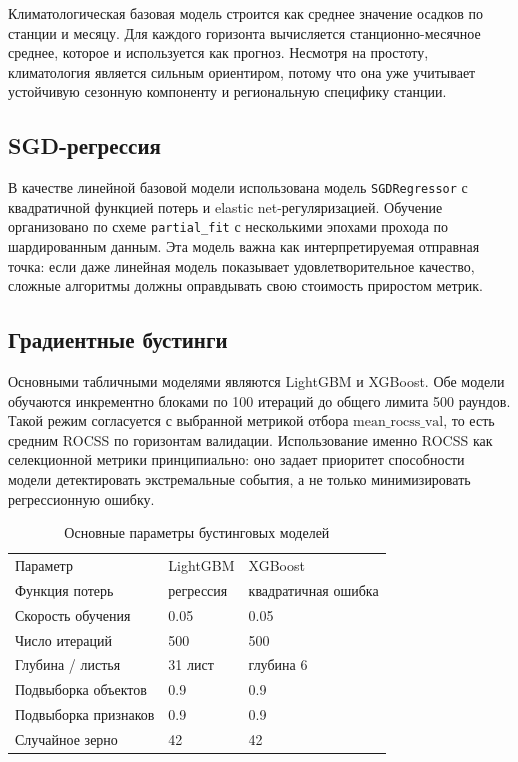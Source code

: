 Климатологическая базовая модель строится как среднее значение осадков по станции и месяцу. Для каждого горизонта вычисляется станционно-месячное среднее, которое и используется как прогноз. Несмотря на простоту, климатология является сильным ориентиром, потому что она уже учитывает устойчивую сезонную компоненту и региональную специфику станции.

\subsection{SGD-регрессия}

В качестве линейной базовой модели использована модель \texttt{SGDRegressor} с квадратичной функцией потерь и elastic net-регуляризацией. Обучение организовано по схеме \texttt{partial\_fit} с несколькими эпохами прохода по шардированным данным. Эта модель важна как интерпретируемая отправная точка: если даже линейная модель показывает удовлетворительное качество, сложные алгоритмы должны оправдывать свою стоимость приростом метрик.

\subsection{Градиентные бустинги}

Основными табличными моделями являются LightGBM и XGBoost. Обе модели обучаются инкрементно блоками по 100 итераций до общего лимита 500 раундов. Такой режим согласуется с выбранной метрикой отбора \(\mathrm{mean\_rocss\_val}\), то есть средним ROCSS по горизонтам валидации. Использование именно ROCSS как селекционной метрики принципиально: оно задает приоритет способности модели детектировать экстремальные события, а не только минимизировать регрессионную ошибку.

\begin{table}[H]
\centering
\begin{tabular}{p{}p{}p{}}
Параметр & LightGBM & XGBoost \\
Функция потерь & регрессия & квадратичная ошибка \\
Скорость обучения & 0.05 & 0.05 \\
Число итераций & 500 & 500 \\
Глубина / листья & 31 лист & глубина 6 \\
Подвыборка объектов & 0.9 & 0.9 \\
Подвыборка признаков & 0.9 & 0.9 \\
Случайное зерно & 42 & 42 \\
\end{tabular}
\caption{Основные параметры бустинговых моделей}
\label{tab:boosting-params-main}
\end{table}

